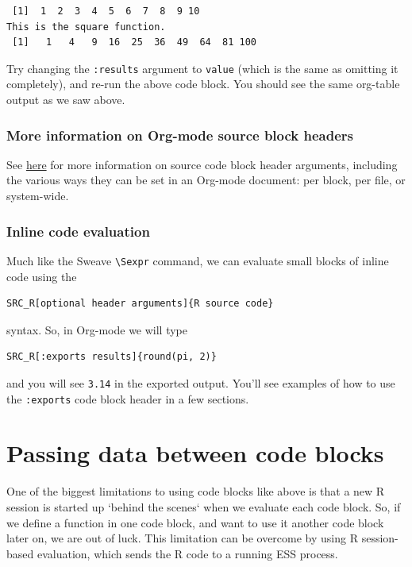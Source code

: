 \documentclass[11pt]{article}
\begin{document}
\begin{verbatim}
 [1]  1  2  3  4  5  6  7  8  9 10
This is the square function.
 [1]   1   4   9  16  25  36  49  64  81 100
\end{verbatim}

Try changing the \texttt{:results} argument to \texttt{value} (which is the same as omitting it completely), and re-run the above code block. You should see the same org-table output as we saw above.
\subsubsection*{More information on Org-mode source block headers}
\label{sec-3-2-3}

See \href{http://orgmode.org/manual/Header-arguments.html#Header-arguments}{here} for more information on source code block header arguments, including the various ways they can be set in an Org-mode document: per block, per file, or system-wide.
\subsubsection*{Inline code evaluation}
\label{sec-3-2-4}
Much like the Sweave \texttt{\textbackslash{}Sexpr} command, we can evaluate small blocks of inline code using the

\begin{verbatim}
SRC_R[optional header arguments]{R source code}
\end{verbatim}

syntax.  So, in Org-mode we will type

\begin{verbatim}
SRC_R[:exports results]{round(pi, 2)}
\end{verbatim}

and you will see \texttt{3.14} in the exported output.  You'll see examples of how to use the \texttt{:exports} code block header in a few sections.
\section*{Passing data between code blocks}
\label{sec-4}

One of the biggest limitations to using code blocks like above is that a new R session is started up `behind the scenes` when we evaluate each code block. So, if we define a function in one code block, and want to use it another code block later on, we are out of luck. This limitation can be overcome by using R session-based evaluation, which sends the R code to a running ESS process.
\end{document}
